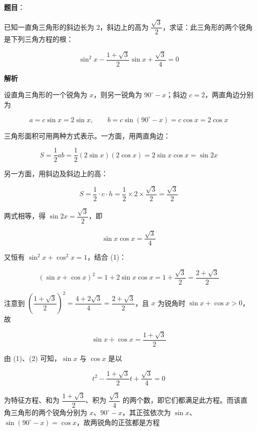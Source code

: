 \begin{answer}

\textbf{题目}：

已知一直角三角形的斜边长为 $2$，斜边上的高为 $\dfrac{\sqrt3}{2}$，求证：此三角形的两个锐角是下列三角方程的根：

\nopagebreak[4]
\[
\sin^2x-\frac{1+\sqrt3}{2}\sin x+\frac{\sqrt3}{4}=0
\]
\nopagebreak[4]
\begin{center}\end{center}
\nopagebreak[4]
\textbf{解析}
\nopagebreak[4]
\begin{center}\end{center}
\nopagebreak[4]
设直角三角形的一个锐角为 $x$，则另一锐角为 $90^\circ-x$；斜边 $c=2$，两直角边分别为

\nopagebreak[4]
\[
a=c\sin x=2\sin x,\qquad b=c\sin(90^\circ-x)=c\cos x=2\cos x
\]

三角形面积可用两种方式表示。一方面，用两直角边：

\nopagebreak[4]
\[
S=\frac12ab=\frac12(2\sin x)(2\cos x)=2\sin x\cos x=\sin2x
\]

另一方面，用斜边及斜边上的高：

\nopagebreak[4]
\[
S=\frac12\cdot c\cdot h=\frac12\times2\times\frac{\sqrt3}2=\frac{\sqrt3}2
\]

两式相等，得 $\sin2x=\dfrac{\sqrt3}2$，即

\nopagebreak[4]
\[
\sin x\cos x=\frac{\sqrt3}4\tag{1}
\]

又恒有 $\sin^2x+\cos^2x=1$，结合 (1)：

\nopagebreak[4]
\[
(\sin x+\cos x)^2=1+2\sin x\cos x=1+\frac{\sqrt3}2=\frac{2+\sqrt3}2
\]

注意到 $\left(\dfrac{1+\sqrt3}2\right)^2=\dfrac{4+2\sqrt3}4=\dfrac{2+\sqrt3}2$，且 $x$ 为锐角时 $\sin x+\cos x>0$，故

\nopagebreak[4]
\[
\sin x+\cos x=\frac{1+\sqrt3}2\tag{2}
\]

由 (1)、(2) 可知，$\sin x$ 与 $\cos x$ 是以

\nopagebreak[4]
\[
t^2-\frac{1+\sqrt3}2t+\frac{\sqrt3}4=0
\]

为特征方程、和为 $\dfrac{1+\sqrt3}2$、积为 $\dfrac{\sqrt3}4$ 的两个数，即它们都满足此方程。而该直角三角形的两个锐角分别为 $x$、$90^\circ-x$，其正弦依次为 $\sin x$、$\sin(90^\circ-x)=\cos x$，故两锐角的正弦都是方程


\end{answer}
